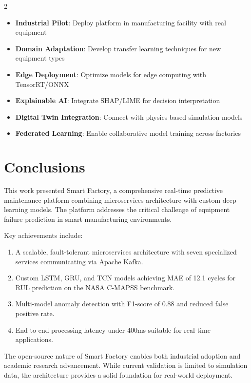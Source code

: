 \documentclass{ijceds} %
\begin{document}
\begin{multicols}{2}
\begin{itemize}
    \item \textbf{Industrial Pilot}: Deploy platform in manufacturing facility with real equipment
    \item \textbf{Domain Adaptation}: Develop transfer learning techniques for new equipment types
    \item \textbf{Edge Deployment}: Optimize models for edge computing with TensorRT/ONNX
    \item \textbf{Explainable AI}: Integrate SHAP/LIME for decision interpretation
    \item \textbf{Digital Twin Integration}: Connect with physics-based simulation models
    \item \textbf{Federated Learning}: Enable collaborative model training across factories
\end{itemize}


\section{Conclusions}
\label{sec:conclusions}

This work presented Smart Factory, a comprehensive real-time predictive maintenance platform combining microservices architecture with custom deep learning models. The platform addresses the critical challenge of equipment failure prediction in smart manufacturing environments.

Key achievements include:

\begin{enumerate}
    \item A scalable, fault-tolerant microservices architecture with seven specialized services communicating via Apache Kafka.
    \item Custom LSTM, GRU, and TCN models achieving MAE of 12.1 cycles for RUL prediction on the NASA C-MAPSS benchmark.
    \item Multi-model anomaly detection with F1-score of 0.88 and reduced false positive rate.
    \item End-to-end processing latency under 400ms suitable for real-time applications.
\end{enumerate}

The open-source nature of Smart Factory enables both industrial adoption and academic research advancement. While current validation is limited to simulation data, the architecture provides a solid foundation for real-world deployment.


\end{multicols}
\end{document}
